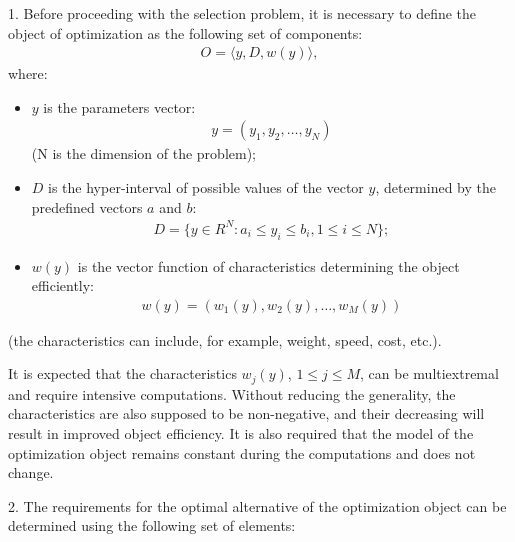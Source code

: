 \documentclass{aip-cp}
\begin{document}
1.	Before proceeding with the selection problem, it is necessary to define the object of optimization as the following set of components:
\begin{eqnarray} \label{eq1}
O = \langle y, D, w(y) \rangle,
\end{eqnarray}
where:
\begin{itemize}
  \item $y$ is the parameters vector:
	\begin{eqnarray*}
		y=(y_1,y_2,\dots,y_N)
	\end{eqnarray*}
		(N is the dimension of the problem);
	\item $D$ is the hyper-interval of possible values of the vector $y$, determined by the predefined vectors $a$ and $b$:	
	\begin{eqnarray*}
	   D=\{y \in R^N:a_i \leq y_i \leq b_i,1 \leq i \leq N\};
	\end{eqnarray*}
	\item $w(y)$ is the vector function of characteristics determining the object efficiently:
	\begin{eqnarray*}
		w(y)=(w_1 (y),w_2 (y),\dots,w_M (y))
	\end{eqnarray*}
\end{itemize}
(the characteristics can include, for example, weight, speed, cost, etc.). \par

It is expected that the characteristics $w_j (y)$, $1 \leq j \leq M$, can be multiextremal and require intensive computations. Without reducing the generality, the characteristics are also supposed to be non-negative, and their decreasing will result in improved object efficiency. It is also required that the model of the optimization object remains constant during the computations and does not change. \par

2. The requirements for the optimal alternative of the optimization object can be determined using the following set of elements:
\end{document}
